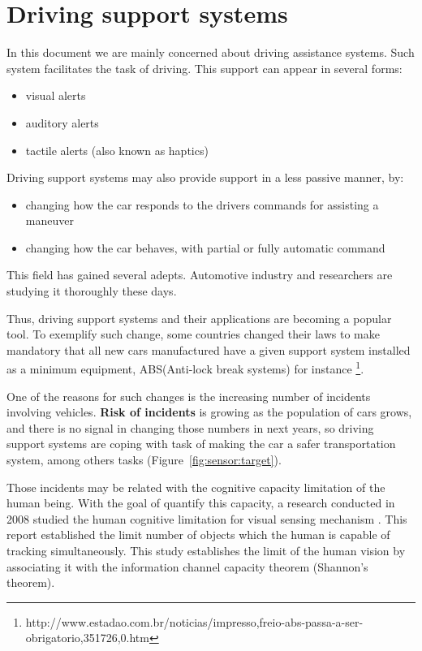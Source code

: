 \section{Driving support systems}

In this document we are mainly concerned about driving assistance systems. Such system facilitates the task of driving. This support can appear in several forms: 

\begin{itemize}
\item visual alerts
\item auditory alerts
\item tactile alerts (also known as haptics\cite{riener2010sensor})
\end{itemize}

Driving support systems may also provide support in a less passive manner, by:

\begin{itemize}
\item changing how the car responds to the drivers commands for assisting a maneuver
\item changing how the car behaves, with partial or fully automatic command
\end{itemize}

This field has gained several adepts. Automotive industry and researchers are studying it thoroughly these days.

Thus, driving support systems and their applications are becoming a popular tool. To exemplify such change, some countries changed their laws to make mandatory that all new cars manufactured have a given support system installed as a minimum equipment, ABS(Anti-lock break systems)  for instance \footnote{http://www.estadao.com.br/noticias/impresso,freio-abs-passa-a-ser-obrigatorio,351726,0.htm}.

One of the reasons for such changes is the increasing number of incidents involving vehicles. \textbf{Risk of incidents} is growing as the population of cars grows, and there is no signal in changing those numbers in next years, so driving support systems are coping with task of making the car a safer transportation system, among others tasks (Figure~\ref{fig:sensor:target}).

Those incidents may be related with the cognitive capacity limitation of the human being. With the goal of quantify this capacity, a research conducted in 2008 studied the human cognitive limitation for visual sensing mechanism \cite{LautarutisV}. This report established the limit number of objects which the human is capable of tracking simultaneously. This study establishes the limit of the human vision by associating it with the information channel capacity theorem (Shannon's theorem). 

